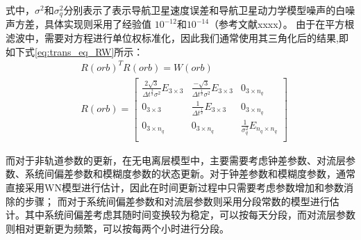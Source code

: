 式中，\(\sigma^{2}\)和\(\sigma_{q}^{2}\)分别表示了表示导航卫星速度误差和导航卫星动力学模型噪声的白噪声方差，具体实现则采用了经验值
\(10^{-12}\)和\(10^{-14}\)（参考文献xxxx）。
由于在平方根滤波中，需要对方程进行单位权标准化，因此我们通常使用其三角化后的结果,即如下式\eqref{eq:trans_eq_RW}所示：
\begin{equation}
	\begin{aligned}
		&R(orb)^{T}R(orb)=W(orb) \\
		& R(orb) =
		\begin{bmatrix}
			\frac{2\sqrt{3}}{\Delta t^{\frac{3}{2}}\sigma^{2}}E_{3\times3} & 
			\frac{-\sqrt{3}}{\Delta t^{\frac{1}{2}}\sigma^{2}}E_{3\times3} &
			0_{3\times n_{q}} \\
			0_{3\times 3} &
			\frac{1}{\Delta t^{\frac{1}{2}}}E_{3\times3} &
			0_{3\times n_{q}} \\
			0_{3\times n_{q}} &
			0_{3\times n_{q}} &
			\frac{1}{\sigma_{q}^{2}}E_{n_{q}\times n_{q}} \\
		\end{bmatrix}
	\end{aligned}	
	\label{eq:trans_eq_RW}
\end{equation}

而对于非轨道参数的更新，在无电离层模型中，主要需要考虑钟差参数、对流层参数、系统间偏差参数和模糊度参数的状态更新。对于钟差参数和模糊度参数，通常直接采用WN模型进行估计，因此在时间更新过程中只需要考虑参数增加和参数消除的步骤；
而对于系统间偏差参数和对流层参数则采用分段常数的模型进行估计。其中系统间偏差考虑其随时间变换较为稳定，可以按每天分段，而对流层参数则相对更新更为频繁，可以按每两个小时进行分段。

